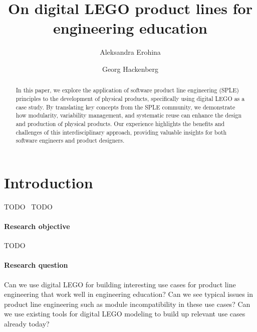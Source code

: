\documentclass[sigconf,review]{acmart}
\begin{document}
\title{On digital LEGO product lines for engineering education}

\author{Aleksandra Erohina}

\author{Georg Hackenberg}

\begin{abstract}

    In this paper, we explore the application of software product line engineering (SPLE) principles to the development of physical products, specifically using digital LEGO as a case study. 
    By translating key concepts from the SPLE community, we demonstrate how modularity, variability management, and systematic reuse can enhance the design and production of physical products. 
    Our experience highlights the benefits and challenges of this interdisciplinary approach, providing valuable insights for both software engineers and product designers.

\end{abstract}


\maketitle

\section{Introduction}
\label{sec:introduction}

TODO~\cite{Hackenberg_2023} TODO~\cite{Baldwin_2023}

\paragraph{Research objective}

TODO

\paragraph{Research question}

Can we use digital LEGO for building interesting use cases for product line engineering that work well in engineering education?
Can we see typical issues in product line engineering such as module incompatibility in these use cases?
Can we use existing tools for digital LEGO modeling to build up relevant use cases already today?
\end{document}
